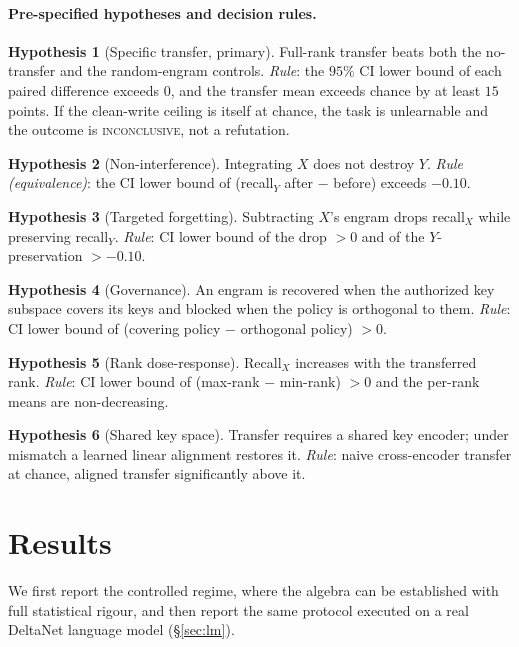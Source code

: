 \documentclass[11pt]{article}
\theoremstyle{definition}
\newtheorem{hypothesis}{Hypothesis}
\begin{document}
\paragraph{Pre-specified hypotheses and decision rules.}
\begin{hypothesis}[Specific transfer, primary]
Full-rank transfer beats both the no-transfer and the random-engram controls. \emph{Rule}: the $95\%$ CI lower bound of each paired difference exceeds $0$, and the transfer mean exceeds chance by at least $15$ points. If the clean-write ceiling is itself at chance, the task is unlearnable and the outcome is \textsc{inconclusive}, not a refutation.
\end{hypothesis}
\begin{hypothesis}[Non-interference]
Integrating $X$ does not destroy $Y$. \emph{Rule (equivalence)}: the CI lower bound of (recall$_Y$ after $-$ before) exceeds $-0.10$.
\end{hypothesis}
\begin{hypothesis}[Targeted forgetting]
Subtracting $X$'s engram drops recall$_X$ while preserving recall$_Y$. \emph{Rule}: CI lower bound of the drop $>0$ and of the $Y$-preservation $>-0.10$.
\end{hypothesis}
\begin{hypothesis}[Governance]
An engram is recovered when the authorized key subspace covers its keys and blocked when the policy is orthogonal to them. \emph{Rule}: CI lower bound of (covering policy $-$ orthogonal policy) $>0$.
\end{hypothesis}
\begin{hypothesis}[Rank dose-response]
Recall$_X$ increases with the transferred rank. \emph{Rule}: CI lower bound of (max-rank $-$ min-rank) $>0$ and the per-rank means are non-decreasing.
\end{hypothesis}
\begin{hypothesis}[Shared key space]
Transfer requires a shared key encoder; under mismatch a learned linear alignment restores it. \emph{Rule}: naive cross-encoder transfer at chance, aligned transfer significantly above it.
\end{hypothesis}

\section{Results}
\label{sec:results}

We first report the controlled regime, where the algebra can be established with full statistical rigour, and then report the same protocol executed on a real DeltaNet language model (\S\ref{sec:lm}).
\end{document}
